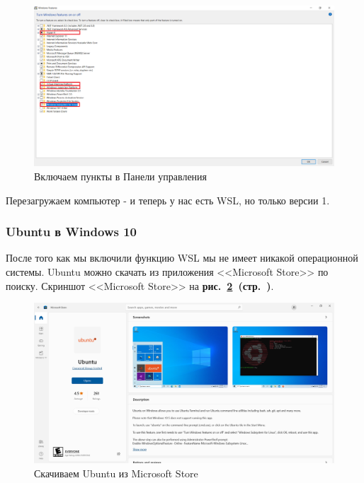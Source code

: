 \begin{figure}[!hp]
    \centering
    \includegraphics[width=16cm]
        {_assets/gpi_pz_controlPanelSettings.png}
    \caption{Включаем пункты в Панели управления}
    \label{fig:gpi_pz_controlPanelSettings}
\end{figure}

Перезагружаем компьютер - и теперь у нас есть WSL, но только версии 1.

\subsubsection*{Ubuntu в Windows 10}

После того как мы включили функцию WSL мы не имеет никакой операционной системы.
Ubuntu можно скачать из приложения <<Microsoft Store>> по поиску.
Скриншот <<Microsoft Store>> на
\textbf{рис.~\ref{fig:gpi_pz_storeUbuntu}~(стр.~\pageref{fig:gpi_pz_storeUbuntu})}.

\begin{figure}[!hp]
    \centering
    \includegraphics[width=16cm]
        {_assets/gpi_pz_storeUbuntu.png}
    \caption{Скачиваем Ubuntu из Microsoft Store}
    \label{fig:gpi_pz_storeUbuntu}
\end{figure}

